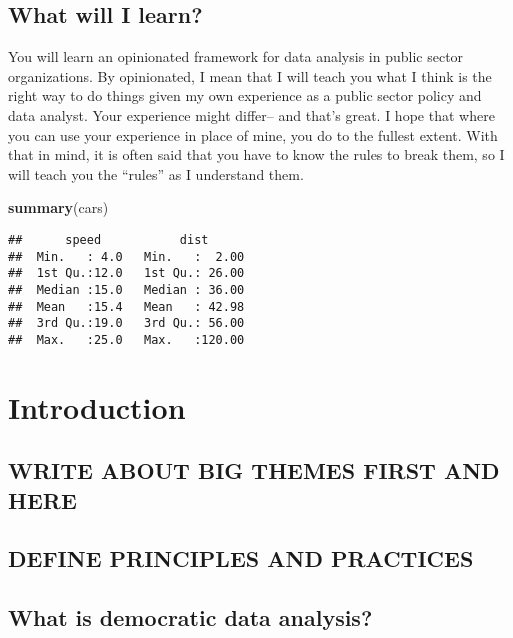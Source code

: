 \documentclass[]{book}
\newenvironment{Shaded}{\begin{snugshade}}{\end{snugshade}}
\newcommand{\KeywordTok}[1]{\textcolor[rgb]{0.13,0.29,0.53}{\textbf{#1}}}
\newcommand{\NormalTok}[1]{#1}
\begin{document}
\section*{What will I learn?}\label{what-will-i-learn}

You will learn an opinionated framework for data analysis in public
sector organizations. By opinionated, I mean that I will teach you what
I think is the right way to do things given my own experience as a
public sector policy and data analyst. Your experience might differ--
and that's great. I hope that where you can use your experience in place
of mine, you do to the fullest extent. With that in mind, it is often
said that you have to know the rules to break them, so I will teach you
the ``rules'' as I understand them.

\begin{Shaded}
\begin{Highlighting}[]
\KeywordTok{summary}\NormalTok{(cars)}
\end{Highlighting}
\end{Shaded}

\begin{verbatim}
##      speed           dist       
##  Min.   : 4.0   Min.   :  2.00  
##  1st Qu.:12.0   1st Qu.: 26.00  
##  Median :15.0   Median : 36.00  
##  Mean   :15.4   Mean   : 42.98  
##  3rd Qu.:19.0   3rd Qu.: 56.00  
##  Max.   :25.0   Max.   :120.00
\end{verbatim}

\chapter{Introduction}\label{intro}

\section{WRITE ABOUT BIG THEMES FIRST AND
HERE}\label{write-about-big-themes-first-and-here}

\section{DEFINE PRINCIPLES AND
PRACTICES}\label{define-principles-and-practices}

\section{What is democratic data
analysis?}\label{what-is-democratic-data-analysis}
\end{document}
